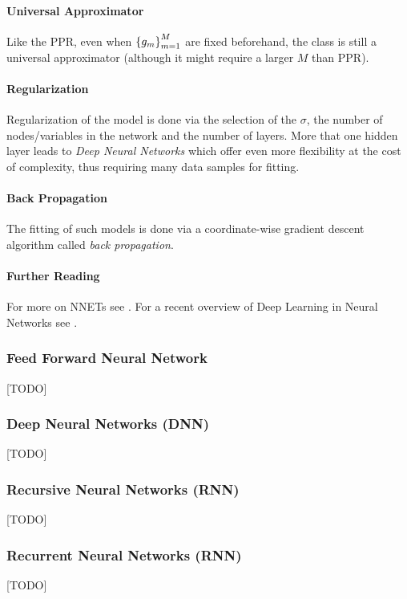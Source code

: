 \paragraph{Universal Approximator}
Like the PPR, even when $\left\{ g_m \right\}_{m=1}^M$ are fixed beforehand, the class is still a universal approximator (although it might require a larger $M$ than PPR).

\paragraph{Regularization}
Regularization of the model is done via the selection of the $\sigma$, the number of nodes/variables in the network and the number of layers. More that one hidden layer leads to \emph{Deep Neural Networks} which offer even more flexibility at the cost of complexity, thus requiring many data samples for fitting.

\paragraph{Back Propagation}
The fitting of such models is done via a coordinate-wise gradient descent algorithm called \emph{back propagation}.

\paragraph{Further Reading}
For more on NNETs see \citep[Chapter 11]{hastie_elements_2003}.
For a recent overview of Deep Learning in Neural Networks see \cite{schmidhuber_deep_2015}.


\subsubsection{Feed Forward Neural Network}
[TODO]


\subsubsection{Deep Neural Networks (DNN)}
[TODO]

\subsubsection{Recursive Neural Networks (RNN)}
[TODO]


\subsubsection{Recurrent Neural Networks (RNN)}
[TODO]

